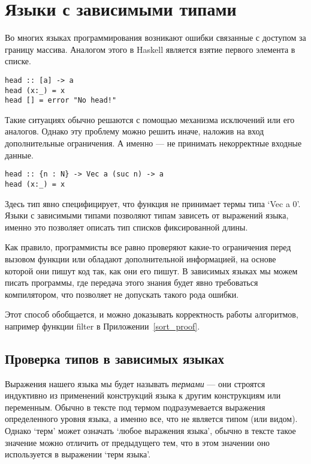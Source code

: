\section{Языки с зависимыми типами} \label{deptypes_intro}
Во многих языках программирования возникают ошибки связанные с доступом за границу массива.
Аналогом этого в Haskell является взятие первого элемента в списке.

\begin{lstlisting}[frame=single]
head :: [a] -> a
head (x:_) = x
head [] = error "No head!"
\end{lstlisting}

Такие ситуациях обычно решаются с помощью механизма исключений или его аналогов. Однако эту проблему можно решить иначе, наложив на вход дополнительные ограничения. А именно --- не принимать некорректные входные данные.

\begin{lstlisting}[frame=single]
head :: {n : N} -> Vec a (suc n) -> a
head (x:_) = x
\end{lstlisting}

Здесь тип явно специфицирует, что функция не принимает термы типа `Vec a 0'. Языки с зависимыми типами позволяют типам зависеть от выражений языка, именно это позволяет описать тип списков фиксированной длины.

Как правило, программисты все равно проверяют какие-то ограничения перед вызовом функции или обладают дополнительной информацией, на основе которой они пишут код так, как они его пишут. В зависимых языках мы можем писать программы, где передача этого знания будет явно требоваться компилятором, что позволяет не допускать такого рода ошибки.

Этот способ обобщается, и можно доказывать корректность работы алгоритмов, например функции filter в Приложении~\ref{sort_proof}.

\subsection{Проверка типов в зависимых языках}\label{typecheck}
Выражения нашего языка мы будет называть \textit{термами} --- они строятся индуктивно из применений конструкций языка к другим конструкциям или переменным. Обычно в тексте под термом подразумевается выражения определенного уровня языка, а именно все, что не является типом (или видом). Однако `терм' может означать `любое выражения языка', обычно в тексте такое значение можно отличить от предыдущего тем, что в этом значении оно используется в выражении `терм языка'.

